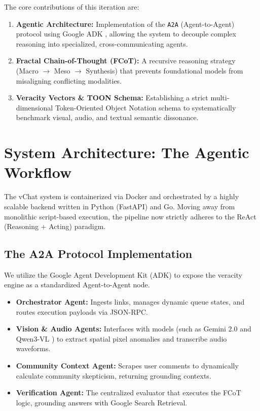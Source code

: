 \documentclass[12pt,letterpaper]{article}
\begin{document}
The core contributions of this iteration are:
\begin{enumerate}
    \item \textbf{Agentic Architecture:} Implementation of the \texttt{A2A} (Agent-to-Agent) protocol using Google ADK \cite{google_adk}, allowing the system to decouple complex reasoning into specialized, cross-communicating agents.
    \item \textbf{Fractal Chain-of-Thought (FCoT):} A recursive reasoning strategy (Macro $\rightarrow$ Meso $\rightarrow$ Synthesis) that prevents foundational models from misaligning conflicting modalities.
    \item \textbf{Veracity Vectors \& TOON Schema:} Establishing a strict multi-dimensional Token-Oriented Object Notation schema to systematically benchmark visual, audio, and textual semantic dissonance.
\end{enumerate}

\section{System Architecture: The Agentic Workflow}

The vChat system is containerized via Docker and orchestrated by a highly scalable backend written in Python (FastAPI) and Go. Moving away from monolithic script-based execution, the pipeline now strictly adheres to the ReAct (Reasoning + Acting) paradigm.

\subsection{The A2A Protocol Implementation}
We utilize the Google Agent Development Kit (ADK) to expose the veracity engine as a standardized Agent-to-Agent node.
\begin{itemize}
    \item \textbf{Orchestrator Agent:} Ingests links, manages dynamic queue states, and routes execution payloads via JSON-RPC.
    \item \textbf{Vision \& Audio Agents:} Interfaces with models (such as Gemini 2.0 and Qwen3-VL \cite{li2024videochat}) to extract spatial pixel anomalies and transcribe audio waveforms.
    \item \textbf{Community Context Agent:} Scrapes user comments to dynamically calculate community skepticism, returning grounding contexts.
    \item \textbf{Verification Agent:} The centralized evaluator that executes the FCoT logic, grounding answers with Google Search Retrieval.
\end{itemize}
\end{document}
